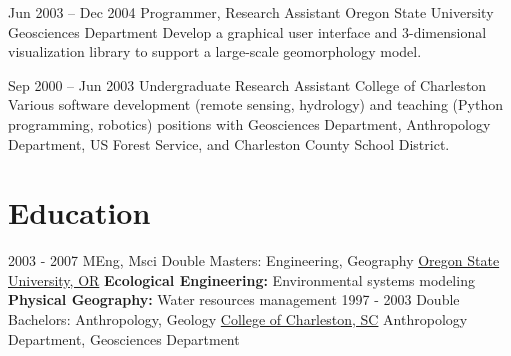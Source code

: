 \documentclass[letterpaper]{twentysecondcv} %
\begin{document}
\begin{twenty}
        \twentyitem
        {Jun 2003 –}
        {Dec 2004}
        {Programmer, Research Assistant}
        {Oregon State University}
        {Geosciences Department}
        {Develop a graphical user interface and 3-dimensional visualization library to support a large-scale geomorphology model.}
        
        \twentyitem
        {Sep 2000 –}
        {Jun 2003}
        {Undergraduate Research Assistant}
        {College of Charleston}
        {}
        {Various software development (remote sensing, hydrology) and teaching (Python programming, robotics) positions with Geosciences Department, Anthropology Department, US Forest Service, and Charleston County School District. }
        
\end{twenty}

\section{Education}

\begin{twenty} %
	\twentyitem
    	{2003 - 2007}
        {MEng, Msci}
        {Double Masters: Engineering, Geography}
        {\href{http://www.oregonstate.edu/}{Oregon State University, OR}}
        {\textbf{Ecological Engineering:} Environmental systems modeling}
        {\textbf{Physical Geography:} Water resources management}
	\twentyitem
    	{1997 - 2003}
	{}
        {Double Bachelors: Anthropology, Geology}
        {\href{http://www.cofc.edu/}{College of Charleston, SC}}
        {Anthropology Department, Geosciences Department}
        {}
\end{twenty}

\end{document}
